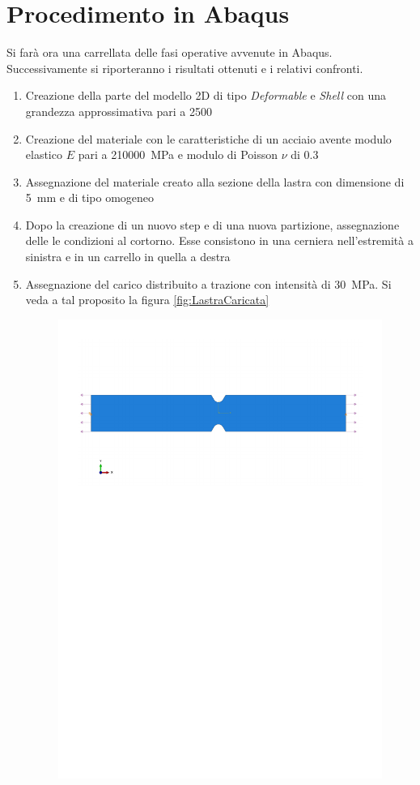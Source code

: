 \section{Procedimento in Abaqus}
Si farà ora una carrellata delle fasi operative avvenute in Abaqus. Successivamente si riporteranno i risultati ottenuti e i relativi confronti.
\begin{enumerate}
    \item Creazione della parte del modello 2D di tipo \emph{Deformable} e \emph{Shell} con una grandezza approssimativa pari a \SI{2500}{}
    \item Creazione del materiale con le caratteristiche di un acciaio avente modulo elastico $E$ pari a \SI{210000}{\mega\pascal} e modulo di Poisson $\nu$ di \SI{0.3}{}
    \item Assegnazione del materiale creato alla sezione della lastra con dimensione di \SI{5}{\milli\metre} e di tipo omogeneo
    \item Dopo la creazione di un nuovo step e di una nuova partizione, assegnazione delle le condizioni al cortorno. Esse consistono in una cerniera nell'estremità a sinistra e in un carrello in quella a destra
    \item Assegnazione del carico distribuito a trazione con intensità di \SI{30}{\mega\pascal}. Si veda a tal proposito la figura \ref{fig:LastraCaricata}
    \begin{figure}[htb]
        \centering
        \includegraphics[width=\textwidth]{rel2/img2/LastraCaricata.pdf}

\end{figure}
\end{enumerate}
